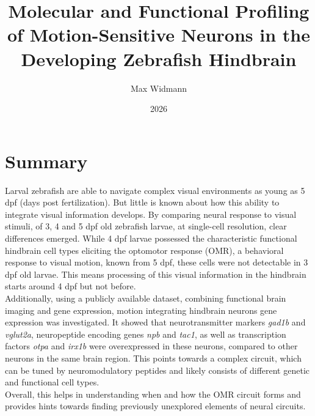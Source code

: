 \documentclass[12pt, a4paper, oneside]{article}
\title{Molecular and Functional Profiling of Motion-Sensitive Neurons in the Developing Zebrafish Hindbrain}
\author{Max Widmann}
\date{2026}
\begin{document}






\section*{Summary}
Larval zebrafish are able to navigate complex visual environments as young as 5 dpf (days post fertilization). But little is known about how this ability to integrate visual information develops. By comparing neural response to visual stimuli, of 3, 4 and 5 dpf old zebrafish larvae, at single-cell resolution, clear differences emerged. While 4 dpf larvae possessed the characteristic functional hindbrain cell types eliciting the optomotor response (OMR), a behavioral response to visual motion, known from 5 dpf, these cells were not detectable in 3 dpf old larvae. This means processing of this visual information in the hindbrain starts around 4 dpf but not before.\\
Additionally, using a publicly available dataset, combining functional brain imaging and gene expression, motion integrating hindbrain neurons gene expression was investigated. It showed that neurotransmitter markers \textit{gad1b} and \textit{vglut2a}, neuropeptide encoding genes \textit{npb} and \textit{tac1}, as well as transcription factors \textit{otpa} and \textit{irx1b} were overexpressed in these neurons, compared to other neurons in the same brain region. This points towards a complex circuit, which can be tuned by neuromodulatory peptides and likely consists of different genetic and functional cell types.\\
Overall, this helps in understanding when and how the OMR circuit forms and provides hints towards finding previously unexplored elements of neural circuits. 
	

\clearpage
\end{document}
